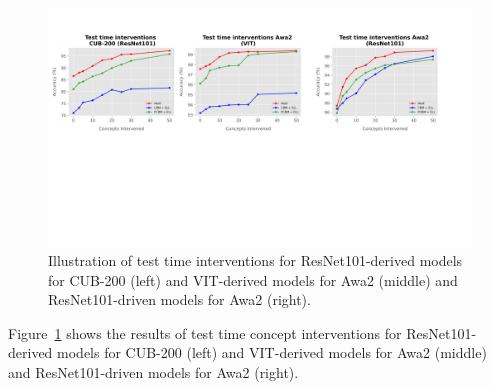 \begin{figure}
\centering
\includegraphics[width=\columnwidth]{figures/Supp/TTI_rest.pdf}
\vskip -7pt
\caption{Illustration of test time interventions for ResNet101-derived models for CUB-200 (left) and VIT-derived models for Awa2 (middle) and ResNet101-driven models for Awa2 (right).}
\vskip -7pt
\label{fig:tti_expert}
\end{figure}

Figure~\ref{fig:tti_expert} shows the results of test time concept interventions for ResNet101-derived models for CUB-200 (left) and VIT-derived models for Awa2 (middle) and ResNet101-driven models for Awa2 (right).